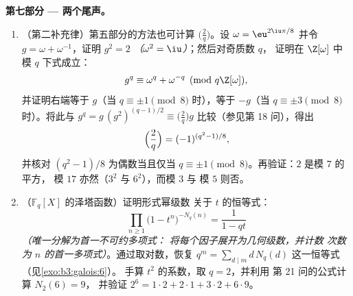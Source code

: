 \begin{problem}
\medskip
\noindent\textbf{第七部分 --- 两个尾声。}
\begin{enumerate}[resume]
  \item （第二补充律）第五部分的方法也可计算
        $\bigl(\frac2q\bigr)$。设 $\omega = \eu^{2\iu\pi/8}$
        并令 $g = \omega + \omega^{-1}$，证明 $g^2 = 2$
        \emph{（$\omega^2 = \iu$）}；然后对奇质数 $q$，
        证明在 $\Z[\omega]$ 中模 $q$ 下式成立：
        \[
        g^q \equiv \omega^q + \omega^{-q} \pmod{q\Z[\omega]},
        \]
        并证明右端等于 $g$（当 $q \equiv \pm1
        \pmod 8$ 时），等于 $-g$（当 $q \equiv \pm3 \pmod 8$ 时）。将此与
        $g^q = g\,(g^2)^{(q-1)/2} \equiv
        \bigl(\frac2q\bigr)g$ 比较（参见第 18 问），得出
        \[
        \Bigl(\frac2q\Bigr) = (-1)^{(q^2-1)/8},
        \]
        并核对 $(q^2 - 1)/8$ 为偶数当且仅当 $q
        \equiv \pm1 \pmod 8$。再验证：$2$ 是模 $7$ 的平方，
        模 $17$ 亦然（$3^2$ 与 $6^2$），而模 $3$ 与
        模 $5$ 则否。
  \item （$\mathbb F_q[X]$ 的泽塔函数）证明形式幂级数
        关于 $t$ 的恒等式：
        \[
        \prod_{n \geq 1}\bigl(1 - t^n\bigr)^{-N_q(n)}
        = \frac1{1 - qt}
        \]
        \emph{（唯一分解为首一不可约多项式：
        将每个因子展开为几何级数，并计数
        次数为 $n$ 的首一多项式）}。通过取对数，恢复
        $q^m = \sum_{d \mid m}d\,N_q(d)$ 这一恒等式
        （见\cref{exo:b3:galois:6}）。
        手算 $t^2$ 的系数，取 $q = 2$，并利用
        第 21 问的公式计算 $N_2(6) = 9$，
        并验证 $2^6 = 1\cdot2 + 2\cdot1 + 3\cdot2 +
        6\cdot9$。
\end{enumerate}
\end{problem}

